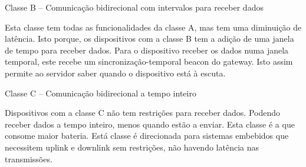 \documentclass[a4paper]{article}
\begin{document}
Classe B – Comunicação bidirecional com intervalos para receber dados

Esta classe tem todas as funcionalidades da classe A, mas tem uma diminuição de latência. Isto porque, os dispositivos com a classe B tem a adição de uma janela de tempo para receber dados. Para o dispositivo receber os dados numa janela temporal, este recebe um sincronização-temporal beacon do gateway. Isto assim permite ao servidor saber quando o dispositivo está à escuta. 

Classe C – Comunicação bidirecional a tempo inteiro

Dispositivos com a classe C não tem restrições para receber dados. Podendo receber dados a tempo inteiro, menos quando estão a enviar. Esta classe é a que consome maior bateria. Está classe é direcionada para sistemas embebidos que necessitem uplink e downlink sem restrições, não havendo latência nas transmissões.
\end{document}
